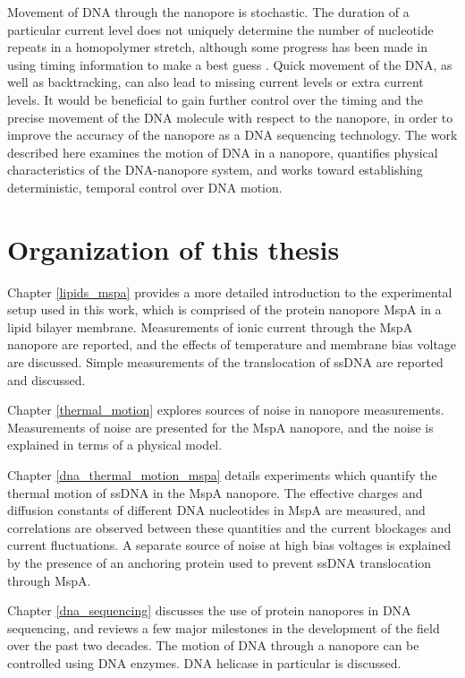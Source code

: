 Movement of DNA through the nanopore is stochastic.  The duration of a particular current level does not uniquely determine the number of nucleotide repeats in a homopolymer stretch, although some progress has been made in using timing information to make a best guess \citep{Sarkozy2017}.  Quick movement of the DNA, as well as backtracking, can also lead to missing current levels or extra current levels.  It would be beneficial to gain further control over the timing and the precise movement of the DNA molecule with respect to the nanopore, in order to improve the accuracy of the nanopore as a DNA sequencing technology.  The work described here examines the motion of DNA in a nanopore, quantifies physical characteristics of the DNA-nanopore system, and works toward establishing deterministic, temporal control over DNA motion.

\section{Organization of this thesis}

Chapter \ref{lipids_mspa} provides a more detailed introduction to the experimental setup used in this work, which is comprised of the protein nanopore MspA in a lipid bilayer membrane.  Measurements of ionic current through the MspA nanopore are reported, and the effects of temperature and membrane bias voltage are discussed.  Simple measurements of the translocation of ssDNA are reported and discussed.

Chapter \ref{thermal_motion} explores sources of noise in nanopore measurements.  Measurements of noise are presented for the MspA nanopore, and the noise is explained in terms of a physical model.

Chapter \ref{dna_thermal_motion_mspa} details experiments which quantify the thermal motion of ssDNA in the MspA nanopore.  The effective charges and diffusion constants of different DNA nucleotides in MspA are measured, and correlations are observed between these quantities and the current blockages and current fluctuations.  A separate source of noise at high bias voltages is explained by the presence of an anchoring protein used to prevent ssDNA translocation through MspA.

Chapter \ref{dna_sequencing} discusses the use of protein nanopores in DNA sequencing, and reviews a few major milestones in the development of the field over the past two decades.  The motion of DNA through a nanopore can be controlled using DNA enzymes.  DNA helicase in particular is discussed.

